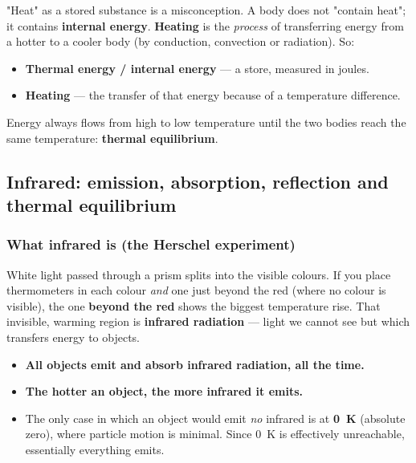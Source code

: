 \documentclass[11pt,a4paper]{article}
\newcommand{\ts}[1]{\textup{[#1]}}       %
\begin{document}
"Heat" as a stored substance is a misconception. A body does not "contain heat"; it
contains \textbf{internal energy}. \textbf{Heating} is the \emph{process} of transferring
energy from a hotter to a cooler body (by conduction, convection or radiation). So:

\begin{itemize}[leftmargin=1.4em,itemsep=1pt]
  \item \textbf{Thermal energy / internal energy} --- a store, measured in joules.
  \item \textbf{Heating} --- the transfer of that energy because of a temperature
        difference.
\end{itemize}

Energy always flows from high to low temperature until the two bodies reach the same
temperature: \textbf{thermal equilibrium}.

\subsection{Infrared: emission, absorption, reflection and thermal equilibrium}

\subsubsection{What infrared is (the Herschel experiment)}
White light passed through a prism splits into the visible colours. If you place
thermometers in each colour \emph{and} one just beyond the red (where no colour is
visible), the one \textbf{beyond the red} shows the biggest temperature rise. That
invisible, warming region is \textbf{infrared radiation} --- light we cannot see but which
transfers energy to objects.

\begin{keybox}[Facts to memorise (9 July \ts{16:26--18:27})]
\begin{itemize}[leftmargin=1.4em,itemsep=1pt]
  \item \textbf{All objects emit and absorb infrared radiation, all the time.}
  \item \textbf{The hotter an object, the more infrared it emits.}
  \item The only case in which an object would emit \emph{no} infrared is at
        \textbf{\SI{0}{K}} (absolute zero), where particle motion is minimal. Since
        \SI{0}{K} is effectively unreachable, essentially everything emits.
\end{itemize}
\end{keybox}
\end{document}

